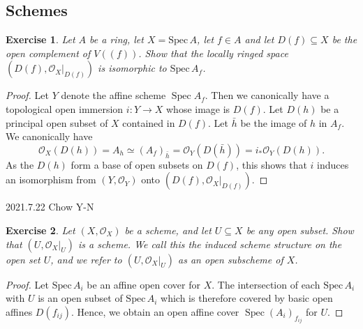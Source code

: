 \documentclass{amsart}
\newtheorem{exe}{Exercise}[subsection]
\theoremstyle{remark}\newtheorem{rmk}[theorem]{Remark}
\begin{document}
\subsection{Schemes}
\begin{exe}
	Let $A$ be a ring, let $X= \mathrm{Spec}\, A$, let $f \in A$ and let $D(f) \subseteq X$ be the open complement of $V((f))$. Show that the locally ringed space $\left(D(f),\mathcal{O}_{X}|_{D(f)}\right)$ is isomorphic to $\mathrm{Spec}\, A_{f}$.
\end{exe}
\begin{proof}
	Let $Y$ denote the affine scheme $\operatorname{Spec} A_{f} .$ Then we canonically have a topological open immersion $i: Y \rightarrow X$ whose image is $D(f) .$ Let $D(h)$ be a principal open subset of $X$ contained in $D(f)$. Let $\bar{h}$ be the image of $h$ in $A_{f} .$ We canonically have $$\mathcal{O}_{X}(D(h))=A_{h} \simeq\left(A_{f}\right)_{\bar{h}}=\mathcal{O}_{Y}(D(\bar{h}))=i_{*} \mathcal{O}_{Y}(D(h)) .$$ As the $D(h)$ form a base of open subsets on $D(f)$, this shows that $i$ induces an isomorphism from $\left(Y, \mathcal{O}_{Y}\right)$ onto $\left(D(f),\mathcal{O}_{X}|_{D(f)}\right)$.
\end{proof}

2021.7.22 Chow Y-N
\begin{exe}
	Let $\left(X, \mathcal{O}_{X}\right)$ be a scheme, and let $U \subseteq X$ be any open subset. Show that $\left(U,\left.\mathcal{O}_{X}\right|_{U}\right)$ is a scheme. We call this the \emph{induced scheme structure} on the open set $U$, and we refer to $(U,\mathcal{O}_X|_U)$ as an \emph{open subscheme} of $X$.
\end{exe}

\begin{proof}
	Let $\mathrm{Spec}\, A_{i}$ be an affine open cover for $X$. The intersection of each $\mathrm{Spec}\, A_{i}$ with $U$ is an open subset of $\mathrm{Spec}\, A_{i}$ which is therefore covered by basic open affines $D(f_{i j})$. Hence, we obtain an open affine cover $\operatorname{Spec}\left(A_{i}\right)_{f_{ij}}$ for $U$.
\end{proof}
\end{document}
